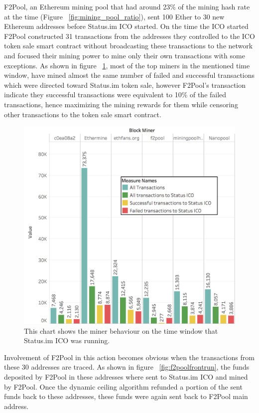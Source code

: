 F2Pool, an Ethereum mining pool that had around 23\% of the mining hash rate at the time (Figure ~\ref{fig:mining_pool_ratio}), sent 100 Ether to 30 new Ethereum addresses before Status.im ICO started. On the time the ICO started F2Pool constructed 31 transactions from the addresses they controlled to the ICO token sale smart contract without broadcasting these transactions to the network and focused their mining power to mine only their own transactions with some exceptions.
As shown in figure  ~\ref{fig:Transactions_miners_while_status_ico_cut}, most of the top miners in the mentioned time window, have mined almost the same number of failed and successful transactions which were directed toward Status.im token sale, however F2Pool's transaction indicate they successful transactions were equivalent to 10\% of the failed transactions, hence maximizing the mining rewards for them while censoring other transactions to the token sale smart contract.


\begin{figure}[h]
\centering
\includegraphics[width=0.5\linewidth]{figures/Transactions_miners_while_status_ico_cut.png}
\caption{This chart shows the miner behaviour on the time window that Status.im ICO was running. \label{fig:Transactions_miners_while_status_ico_cut}} 
\end{figure}


Involvement of F2Pool in this action becomes obvious when the transactions from these 30 addresses are traced. As shown in figure ~\ref{fig:f2poolfrontrun}, the funds deposited by F2Pool in these addresses where sent to Status.im ICO and mined by F2Pool. Once the dynamic ceiling algorithm refunded a portion of the sent funds back to these addresses, these funds were again sent back to F2Pool main address. 


